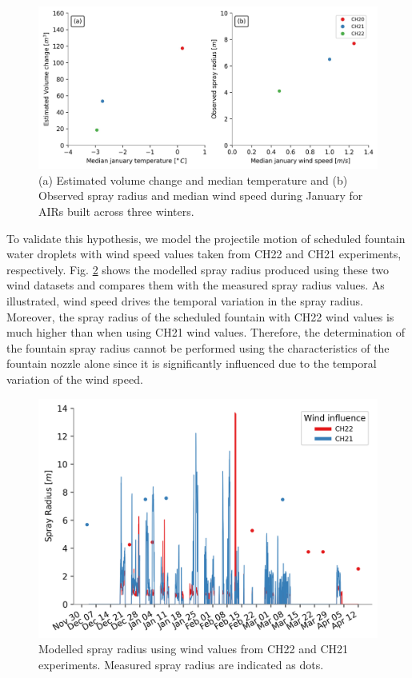 \documentclass[tc, manuscript]{copernicus}
\begin{document}
\begin{figure}[t]
\includegraphics[width=\textwidth]{Figures/CH_diffs.jpg}

\caption{(a) Estimated volume change and median temperature and (b) Observed spray radius and median wind speed
during January for AIRs built across three winters. } 

\label{fig:CH_diffs} 
\end{figure}

To validate this hypothesis, we model the projectile motion of scheduled fountain water droplets with wind speed
values taken from CH22 and CH21 experiments, respectively. Fig. \ref{fig:wind} shows the modelled spray radius
produced using these two wind datasets and compares them with the measured spray radius values. As illustrated,
wind speed drives the temporal variation in the spray radius. Moreover, the spray radius of the scheduled
fountain with CH22 wind values is much higher than when using CH21 wind values. Therefore, the determination of
the fountain spray radius cannot be performed using the characteristics of the fountain nozzle alone since it is
significantly influenced due to the temporal variation of the wind speed.

\begin{figure}[t]
\includegraphics[width=12 cm]{Figures/radf.png}
\caption{Modelled spray radius using wind values from CH22 and CH21 experiments. Measured spray radius are
indicated as dots.}
\label{fig:wind}
\end{figure}
\end{document}

